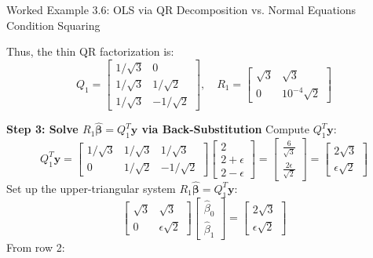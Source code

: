 \begin{examplebox}{Worked Example 3.6: OLS via QR Decomposition vs. Normal Equations Condition Squaring}
\begin{enumerate}
\end{enumerate}
Thus, the thin QR factorization is:
\begin{equation*}
Q_1 = \begin{bmatrix} 1/\sqrt{3} & 0 \\ 1/\sqrt{3} & 1/\sqrt{2} \\ 1/\sqrt{3} & -1/\sqrt{2} \end{bmatrix}, \quad R_1 = \begin{bmatrix} \sqrt{3} & \sqrt{3} \\ 0 & 10^{-4}\sqrt{2} \end{bmatrix}
\end{equation*}

\textbf{Step 3: Solve $R_1 \hat{\boldsymbol{\beta}} = Q_1^T \mathbf{y}$ via Back-Substitution}
Compute $Q_1^T \mathbf{y}$:
\begin{equation*}
Q_1^T \mathbf{y} = \begin{bmatrix} 1/\sqrt{3} & 1/\sqrt{3} & 1/\sqrt{3} \\ 0 & 1/\sqrt{2} & -1/\sqrt{2} \end{bmatrix} \begin{bmatrix} 2 \\ 2 + \epsilon \\ 2 - \epsilon \end{bmatrix} = \begin{bmatrix} \frac{6}{\sqrt{3}} \\ \frac{2\epsilon}{\sqrt{2}} \end{bmatrix} = \begin{bmatrix} 2\sqrt{3} \\ \epsilon\sqrt{2} \end{bmatrix}
\end{equation*}
Set up the upper-triangular system $R_1 \hat{\boldsymbol{\beta}} = Q_1^T \mathbf{y}$:
\begin{equation*}
\begin{bmatrix} \sqrt{3} & \sqrt{3} \\ 0 & \epsilon\sqrt{2} \end{bmatrix} \begin{bmatrix} \hat{\beta}_0 \\ \hat{\beta}_1 \end{bmatrix} = \begin{bmatrix} 2\sqrt{3} \\ \epsilon\sqrt{2} \end{bmatrix}
\end{equation*}
From row 2:
\begin{equation*}

\end{equation*}
\end{examplebox}
